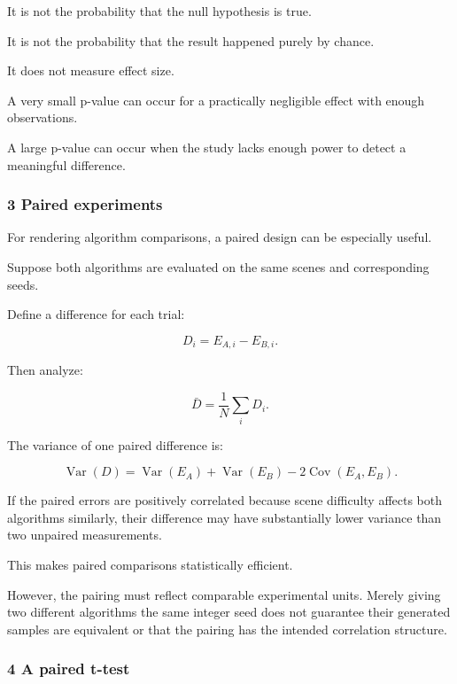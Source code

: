 It is not the probability that the null hypothesis is true.

It is not the probability that the result happened purely by chance.

It does not measure effect size.

A very small p-value can occur for a practically negligible effect with enough observations.

A large p-value can occur when the study lacks enough power to detect a meaningful difference.

\subsubsection{3 Paired experiments}\label{02-foundations-ii-ch030-paired-experiments}

\hypertarget{02-foundations-ii-ch030-paired-experiments}{}

For rendering algorithm comparisons, a paired design can be especially useful.

Suppose both algorithms are evaluated on the same scenes and corresponding seeds.

Define a difference for each trial:

\[
 D_i=E_{A,i}-E_{B,i}.
\]

Then analyze:

\[
 \bar D=\frac1N\sum_iD_i.
\]

The variance of one paired difference is:

\[
 \operatorname{Var}(D) = \operatorname{Var}(E_A)+ \operatorname{Var}(E_B)- 2\operatorname{Cov}(E_A,E_B).
\]

If the paired errors are positively correlated because scene difficulty affects both algorithms similarly, their difference may have substantially lower variance than two unpaired measurements.

This makes paired comparisons statistically efficient.

However, the pairing must reflect comparable experimental units. Merely giving two different algorithms the same integer seed does not guarantee their generated samples are equivalent or that the pairing has the intended correlation structure.

\subsubsection{4 A paired t-test}\label{02-foundations-ii-ch030-a-paired-t-test}

\hypertarget{02-foundations-ii-ch030-a-paired-t-test}{}

